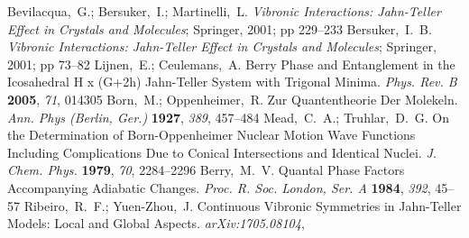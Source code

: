 \documentclass[superscriptaddress,showpacs,amsmath,amssymb,pra,twocolumn]{revtex4-1}
\begin{document}
\begin{thebibliography}{61}
\EndOfBibitem
{}
Bevilacqua,~G.; Bersuker,~I.; Martinelli,~L. \emph{Vibronic {{Interactions}}:
  {{Jahn}}-{{Teller Effect}} in {{Crystals}} and {{Molecules}}}; {Springer},
  2001; pp 229--233\relax
\mciteBstWouldAddEndPuncttrue
\mciteSetBstMidEndSepPunct{\mcitedefaultmidpunct}
{\mcitedefaultendpunct}{\mcitedefaultseppunct}\relax
\EndOfBibitem
{}
Bersuker,~I.~B. \emph{Vibronic {{Interactions}}: {{Jahn}}-{{Teller Effect}} in
  {{Crystals}} and {{Molecules}}}; {Springer}, 2001; pp 73--82\relax
\mciteBstWouldAddEndPuncttrue
\mciteSetBstMidEndSepPunct{\mcitedefaultmidpunct}
{\mcitedefaultendpunct}{\mcitedefaultseppunct}\relax
\EndOfBibitem
{}
Lijnen,~E.; Ceulemans,~A. Berry Phase and Entanglement in the Icosahedral {{H}}
  x (G+2h) {{Jahn}}-{{Teller}} System with Trigonal Minima. \emph{Phys. Rev. B} \textbf{2005}, \emph{71}, 014305\relax
\mciteBstWouldAddEndPuncttrue
\mciteSetBstMidEndSepPunct{\mcitedefaultmidpunct}
{\mcitedefaultendpunct}{\mcitedefaultseppunct}\relax
\EndOfBibitem
{}
Born,~M.; Oppenheimer,~R. Zur {{Quantentheorie}} Der {{Molekeln}}.
  \emph{Ann. Phys (Berlin, Ger.)} \textbf{1927}, \emph{389}, 457--484\relax
\mciteBstWouldAddEndPuncttrue
\mciteSetBstMidEndSepPunct{\mcitedefaultmidpunct}
{\mcitedefaultendpunct}{\mcitedefaultseppunct}\relax
\EndOfBibitem
{}
Mead,~C.~A.; Truhlar,~D.~G. On the Determination of Born-Oppenheimer
  Nuclear Motion Wave Functions Including Complications Due to Conical
  Intersections and Identical Nuclei. \emph{J. Chem. Phys.}
  \textbf{1979}, \emph{70}, 2284--2296\relax
\mciteBstWouldAddEndPuncttrue
\mciteSetBstMidEndSepPunct{\mcitedefaultmidpunct}
{\mcitedefaultendpunct}{\mcitedefaultseppunct}\relax
\EndOfBibitem
{}
Berry,~M.~V. Quantal {{Phase Factors Accompanying Adiabatic Changes}}.
  \emph{Proc. R. Soc. London, Ser. A} \textbf{1984}, \emph{392}, 45--57\relax
\mciteBstWouldAddEndPuncttrue
\mciteSetBstMidEndSepPunct{\mcitedefaultmidpunct}
{\mcitedefaultendpunct}{\mcitedefaultseppunct}\relax
\EndOfBibitem
{}
Ribeiro,~R.~F.; Yuen-Zhou,~J. Continuous Vibronic Symmetries in
  {{Jahn}}-{{Teller}} Models: Local and Global Aspects. \emph{arXiv:1705.08104},

\end{thebibliography}
\end{document}
